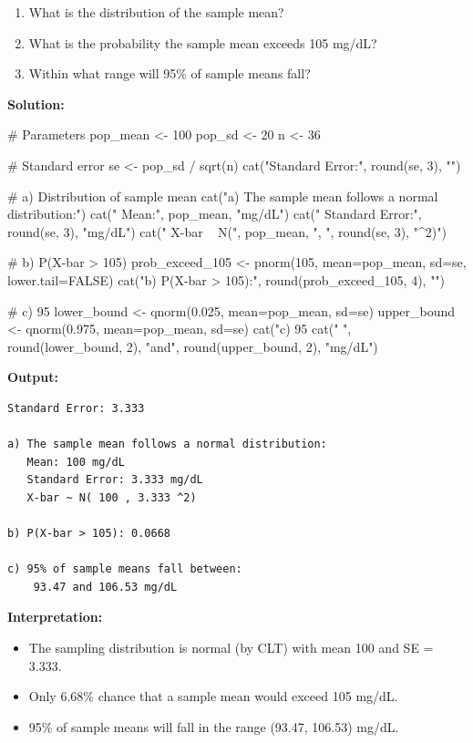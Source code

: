 \documentclass[11pt]{article}
\begin{document}
\begin{enumerate}[label=\alph*)]
\item What is the distribution of the sample mean?
\item What is the probability the sample mean exceeds 105 mg/dL?
\item Within what range will 95\% of sample means fall?
\end{enumerate}

\textbf{Solution:}

\begin{rcode}
# Parameters
pop_mean <- 100
pop_sd <- 20
n <- 36

# Standard error
se <- pop_sd / sqrt(n)
cat("Standard Error:", round(se, 3), "\n\n")

# a) Distribution of sample mean
cat("a) The sample mean follows a normal distribution:\n")
cat("   Mean:", pop_mean, "mg/dL\n")
cat("   Standard Error:", round(se, 3), "mg/dL\n")
cat("   X-bar ~ N(", pop_mean, ", ", round(se, 3), "^2)\n\n")

# b) P(X-bar > 105)
prob_exceed_105 <- pnorm(105, mean=pop_mean, sd=se, lower.tail=FALSE)
cat("b) P(X-bar > 105):", round(prob_exceed_105, 4), "\n\n")

# c) 95%
lower_bound <- qnorm(0.025, mean=pop_mean, sd=se)
upper_bound <- qnorm(0.975, mean=pop_mean, sd=se)
cat("c) 95%
cat("   ", round(lower_bound, 2), "and", round(upper_bound, 2), "mg/dL\n")
\end{rcode}

\begin{routput}
\textbf{Output:}
\begin{verbatim}
Standard Error: 3.333

a) The sample mean follows a normal distribution:
   Mean: 100 mg/dL
   Standard Error: 3.333 mg/dL
   X-bar ~ N( 100 , 3.333 ^2)

b) P(X-bar > 105): 0.0668

c) 95% of sample means fall between:
    93.47 and 106.53 mg/dL
\end{verbatim}
\end{routput}

\textcolor{correctgreen}{\textbf{Interpretation:}}
\begin{itemize}
\item The sampling distribution is normal (by CLT) with mean 100 and SE = 3.333.
\item Only 6.68\% chance that a sample mean would exceed 105 mg/dL.
\item 95\% of sample means will fall in the range (93.47, 106.53) mg/dL.
\end{itemize}
\end{document}
